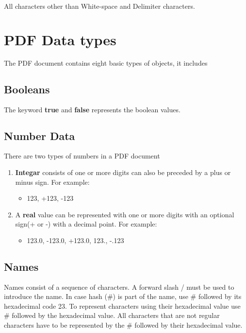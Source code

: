 All characters other than White-space and Delimiter characters.

\section{PDF Data types}

The PDF document contains eight basic types of objects, it includes

\subsection{Booleans}

The keyword \textbf{true} and \textbf{false} represents the boolean values.

\subsection{Number Data}

There are two types of numbers in a PDF document

\begin{enumerate}
	\item \textbf{Integar} consists of one or more digits can also be preceded by a plus or minus sign. For example:
	\begin{itemize}
		\item 123, +123, -123
	\end{itemize}
    \item A \textbf{real} value can be represented with one or more digits with an optional sign(+ or -) with a decimal point. For example:
    \begin{itemize}
    	\item 123.0, -123.0, +123.0, 123., -.123
    \end{itemize}
\end{enumerate}

\subsection{Names}

Names consist of a sequence of characters. A forward slash / must be used to introduce the name. In case hash (\#) is part of the name, use \# followed by its hexadecimal code 23. To represent characters using their hexadecimal value use \# followed by the hexadecimal value. All characters that are not regular characters have to be represented by the \# followed by their hexadecimal value.

